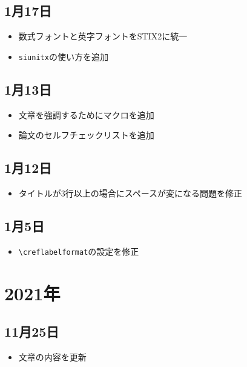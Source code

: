 \subsection*{1月17日}

\begin{itemize}
  \item 数式フォントと英字フォントをSTIX2に統一
  \item \texttt{siunitx}の使い方を追加
\end{itemize}

\subsection*{1月13日}

\begin{itemize}
  \item 文章を強調するためにマクロを追加
  \item 論文のセルフチェックリストを追加
\end{itemize}

\subsection*{1月12日}

\begin{itemize}
  \item タイトルが3行以上の場合にスペースが変になる問題を修正
\end{itemize}

\subsection*{1月5日}

\begin{itemize}
  \item \texttt{\backslash creflabelformat}の設定を修正
\end{itemize}

\section*{2021年}

\subsection*{11月25日}

\begin{itemize}
  \item 文章の内容を更新
\end{itemize}

